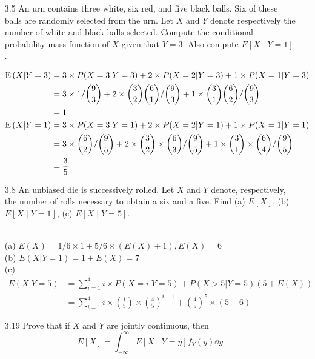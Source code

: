 \documentclass[en,hazy,blue,12pt,device = normal]{elegantnote}
\begin{document}
\begin{enumerate}
    \item[3.5] An urn contains three white, six red, and five black balls. Six of these balls are randomly selected from the urn. Let $X$ and $Y$ denote respectively the number of white and black balls selected. Compute the conditional probability mass function of $X$ given that $Y=3$. Also compute $E[X \mid Y=1]$.
    \begin{tcolorbox}
        \sol
        \begin{align*}
            \operatorname E\left(X|Y=3\right) &= 3\times P(X=3|Y=3) + 2\times P(X = 2|Y=3) + 1\times P(X= 1|Y=3) \\
            &= 3\times 1/\binom{9}{3} + 2\times \binom{3}{2}\binom{6}{1}/\binom{9}{3} +1\times \binom{3}{1}\binom{6}{2} /\binom{9}{3}\\
            &= 1\\
            \operatorname E\left(X|Y=1\right) &= 3\times P(X=3|Y=1) + 2\times P(X = 2|Y=1) + 1\times P(X= 1|Y=1)\\
            &=3\times \binom{6}{2}/\binom{9}{5} + 2\times \binom{3}{2}\times\binom{6}{3}/\binom{9}{5} +1\times \binom{3}{1}\times\binom{6}{4} /\binom{9}{5}\\
            &= \frac{3}{5}
        \end{align*}
    \end{tcolorbox}
    \item[3.8]An unbiased die is successively rolled. Let $X$ and $Y$ denote, respectively, the number of rolls necessary to obtain a six and a five. Find (a) $E[X]$, (b) $E[X \mid Y=1]$, (c) $E[X \mid Y=5]$.
    \begin{tcolorbox}
        \sol\\
        (a) \(E(X) = 1/6\times 1 + 5/6\times (E(X)+1), E(X) = 6\)\\
        (b) \(E(X|Y = 1) = 1 + E(X) = 7\)\\
        (c) \begin{align*}
            E(X|Y=5) &= \sum_{i=1}^4 i\times P(X=i|Y=5)+ P(X > 5|Y=5)(5+E(X))\\
            &= \sum_{i=1}^4 i\times\left(\frac 1 5\right)\times\left(\frac 4 5\right)^{i-1} + \left(\frac 4 5\right)^{5}\times(5+6)
        \end{align*}
    \end{tcolorbox}

    \item[3.19] Prove that if $X$ and $Y$ are jointly continuous, then
    $$
    E[X]=\int_{-\infty}^{\infty} E[X \mid Y=y] f_Y(y) \dd y
    $$


\end{enumerate}
\end{document}
